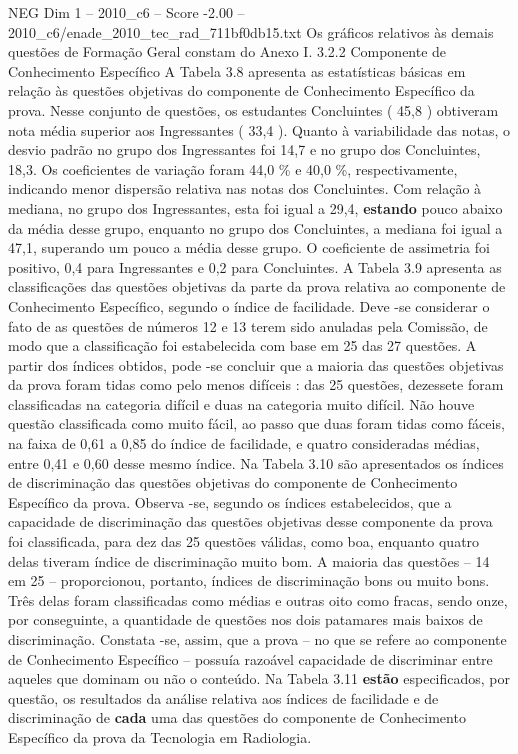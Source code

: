 \begin{textsample}{NEG Dim 1 – 2010\_c6 – Score -2.00 – 2010\_c6/enade\_2010\_tec\_rad\_711bf0db15.txt}
Os gráficos relativos às demais questões de Formação Geral constam do Anexo I. 3.2.2 Componente de Conhecimento Específico A Tabela 3.8 apresenta as estatísticas básicas em relação às questões objetivas do componente de Conhecimento Específico da prova.
Nesse conjunto de questões, os estudantes Concluintes ( 45,8 ) obtiveram nota média superior aos Ingressantes ( 33,4 ).
Quanto à variabilidade das notas, o desvio padrão no grupo dos Ingressantes foi 14,7 e no grupo dos Concluintes, 18,3.
Os coeficientes de variação foram 44,0 \% e 40,0 \%, respectivamente, indicando menor dispersão relativa nas notas dos Concluintes.
Com relação à mediana, no grupo dos Ingressantes, esta foi igual a 29,4, \textbf{estando} pouco abaixo da média desse grupo, enquanto no grupo dos Concluintes, a mediana foi igual a 47,1, superando um pouco a média desse grupo.
O coeficiente de assimetria foi positivo, 0,4 para Ingressantes e 0,2 para Concluintes.
A Tabela 3.9 apresenta as classificações das questões objetivas da parte da prova relativa ao componente de Conhecimento Específico, segundo o índice de facilidade.
Deve -se considerar o fato de as questões de números 12 e 13 terem sido anuladas pela Comissão, de modo que a classificação foi estabelecida com base em 25 das 27 questões.
A partir dos índices obtidos, pode -se concluir que a maioria das questões objetivas da prova foram tidas como pelo menos difíceis : das 25 questões, dezessete foram classificadas na categoria difícil e duas na categoria muito difícil.
Não houve questão classificada como muito fácil, ao passo que duas foram tidas como fáceis, na faixa de 0,61 a 0,85 do índice de facilidade, e quatro consideradas médias, entre 0,41 e 0,60 desse mesmo índice.
Na Tabela 3.10 são apresentados os índices de discriminação das questões objetivas do componente de Conhecimento Específico da prova.
Observa -se, segundo os índices estabelecidos, que a capacidade de discriminação das questões objetivas desse componente da prova foi classificada, para dez das 25 questões válidas, como boa, enquanto quatro delas tiveram índice de discriminação muito bom.
A maioria das questões – 14 em 25 – proporcionou, portanto, índices de discriminação bons ou muito bons.
Três delas foram classificadas como médias e outras oito como fracas, sendo onze, por conseguinte, a quantidade de questões nos dois patamares mais baixos de discriminação.
Constata -se, assim, que a prova – no que se refere ao componente de Conhecimento Específico – possuía razoável capacidade de discriminar entre aqueles que dominam ou não o conteúdo.
Na Tabela 3.11 \textbf{estão} especificados, por questão, os resultados da análise relativa aos índices de facilidade e de discriminação de \textbf{cada} uma das questões do componente de Conhecimento Específico da prova da Tecnologia em Radiologia.

\end{textsample}
